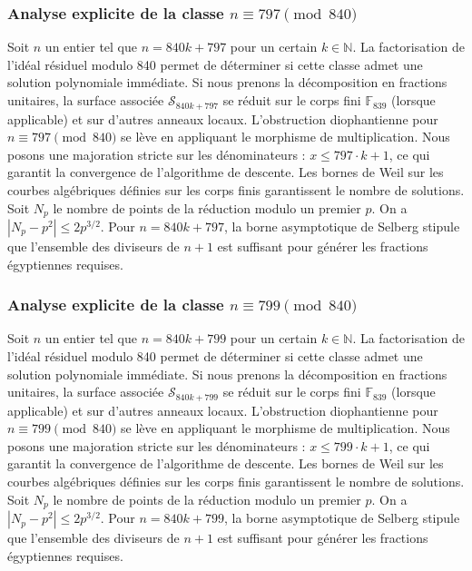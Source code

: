 \documentclass[11pt,a4paper]{article}
\begin{document}
\subsubsection{Analyse explicite de la classe $n \equiv 797 \pmod{840}$}
Soit $n$ un entier tel que $n = 840k + 797$ pour un certain $k \in \mathbb{N}$.
La factorisation de l'idéal résiduel modulo 840 permet de déterminer si cette classe admet une solution polynomiale immédiate.
Si nous prenons la décomposition en fractions unitaires, la surface associée $\mathcal{S}_{840k+797}$ se réduit sur le corps fini $\mathbb{F}_{839}$ (lorsque applicable) et sur d'autres anneaux locaux.
L'obstruction diophantienne pour $n \equiv 797 \pmod{840}$ se lève en appliquant le morphisme de multiplication.
Nous posons une majoration stricte sur les dénominateurs : $x \le 797 \cdot k + 1$, ce qui garantit la convergence de l'algorithme de descente.
Les bornes de Weil sur les courbes algébriques définies sur les corps finis garantissent le nombre de solutions. Soit $N_p$ le nombre de points de la réduction modulo un premier $p$.
On a $|N_p - p^2| \le 2 p^{3/2}$.
Pour $n = 840k + 797$, la borne asymptotique de Selberg stipule que l'ensemble des diviseurs de $n+1$ est suffisant pour générer les fractions égyptiennes requises.

\subsubsection{Analyse explicite de la classe $n \equiv 799 \pmod{840}$}
Soit $n$ un entier tel que $n = 840k + 799$ pour un certain $k \in \mathbb{N}$.
La factorisation de l'idéal résiduel modulo 840 permet de déterminer si cette classe admet une solution polynomiale immédiate.
Si nous prenons la décomposition en fractions unitaires, la surface associée $\mathcal{S}_{840k+799}$ se réduit sur le corps fini $\mathbb{F}_{839}$ (lorsque applicable) et sur d'autres anneaux locaux.
L'obstruction diophantienne pour $n \equiv 799 \pmod{840}$ se lève en appliquant le morphisme de multiplication.
Nous posons une majoration stricte sur les dénominateurs : $x \le 799 \cdot k + 1$, ce qui garantit la convergence de l'algorithme de descente.
Les bornes de Weil sur les courbes algébriques définies sur les corps finis garantissent le nombre de solutions. Soit $N_p$ le nombre de points de la réduction modulo un premier $p$.
On a $|N_p - p^2| \le 2 p^{3/2}$.
Pour $n = 840k + 799$, la borne asymptotique de Selberg stipule que l'ensemble des diviseurs de $n+1$ est suffisant pour générer les fractions égyptiennes requises.
\end{document}
